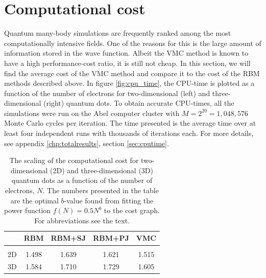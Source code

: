 \section{Computational cost}
Quantum many-body simulations are frequently ranked among the most computationally intensive fields. One of the reasons for this is the large amount of information stored in the wave function. Albeit the VMC method is known to have a high performance-cost ratio, it is still not cheap. In this section, we will find the average cost of the VMC method and compare it to the cost of the RBM methods described above. In figure \eqref{fig:cpu_time}, the CPU-time is plotted as a function of the number of electrons for two-dimensional (left) and three-dimensional (right) quantum dots. To obtain accurate CPU-times, all the simulations were run on the Abel computer cluster with $M=2^{20}=1,048,576$ Monte Carlo cycles per iteration. The time presented is the average time over at least four independent runs with thousands of iterations each. For more details, see appendix \ref{chp:totalresults}, section \ref{sec:cputime}.

\begin{table}
	\caption{The scaling of the computational cost for two-dimensional (2D) and three-dimensional (3D) quantum dots as a function of the number of electrons, $N$. The numbers presented in the table are the optimal $b$-value found from fitting the power function $f(N)=0.5N^b$ to the cost graph. For abbreviations see the text.}
	\begin{tabularx}{\textwidth}{CCCCC} \hline\hline
		\label{tab:cputimefit}
		\makecell{\\ \phantom{=}} & RBM & RBM+SJ & RBM+PJ & VMC \\ \hline \\
		2D & 1.498 & 1.639 & 1.621 & 1.515 \\ 
		3D & 1.584 & 1.710 & 1.729 & 1.605 \\ \hline\hline
	\end{tabularx}
\end{table} 

